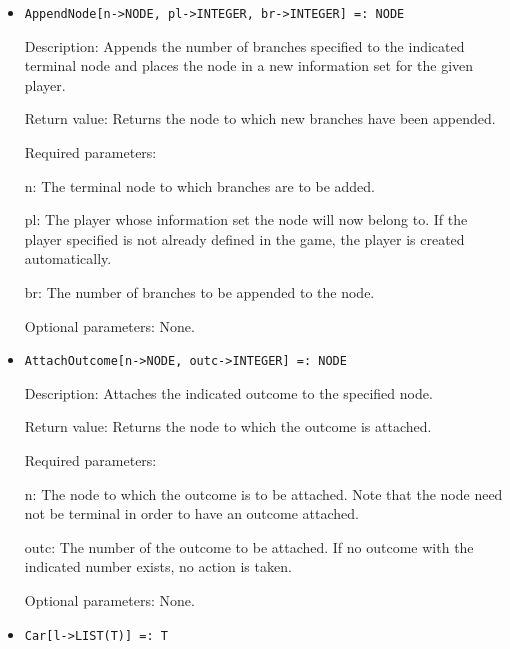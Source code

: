 \begin{itemize}
\item
\protect \large \begin{verbatim}
AppendNode[n->NODE, pl->INTEGER, br->INTEGER] =: NODE
\end{verbatim}
\normalsize

\bd
\item
[Description:] Appends the number of branches specified to the
indicated terminal node and places the node in a new information set
for the given player.
\item
[Return value:] Returns the node to which new branches have been
appended.
\item
[Required parameters:]\hfil\null
\par
\bd
\item
[n:] The terminal node to which branches are to be added.
\item
[pl:] The player whose information set the node will now belong to.
If the player specified is not already defined in the game, the player
is created automatically.
\item
[br:] The number of branches to be appended to the node.
\ed

\item
[Optional parameters:] None.
\ed

\item
\protect \large \begin{verbatim}
AttachOutcome[n->NODE, outc->INTEGER] =: NODE
\end{verbatim}\normalsize

\bd
\item
[Description:] Attaches the indicated outcome to the specified node.
\item
[Return value:] Returns the node to which the outcome is attached.
\item
[Required parameters:]\hfil\null

\bd
\item
[n:] The node to which the outcome is to be attached.  Note that the
node need not be terminal in order to have an outcome attached.
\item
[outc:] The number of the outcome to be attached.  If no outcome with
the indicated number exists, no action is taken.
\ed

\item
[Optional parameters:] None.
\ed

\item

\protect \large \begin{verbatim}
Car[l->LIST(T)] =: T
\end{verbatim}\normalsize


\end{itemize}
